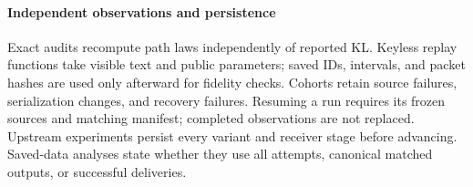 \paragraph{Independent observations and persistence}
Exact audits recompute path laws independently of reported KL. Keyless replay
functions take visible text and public parameters; saved IDs, intervals, and
packet hashes are used only afterward for fidelity checks. Cohorts retain
source failures, serialization changes, and recovery failures. Resuming a run
requires its frozen sources and matching manifest; completed observations are
not replaced. Upstream experiments persist every variant and receiver stage
before advancing. Saved-data analyses state whether they use all attempts,
canonical matched outputs, or successful deliveries.
